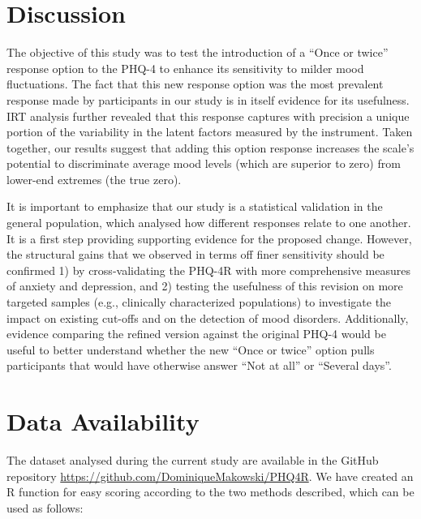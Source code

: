 \documentclass[
  man,floatsintext]{apa6}
\begin{document}
\hypertarget{discussion}{%
\section{Discussion}\label{discussion}}

The objective of this study was to test the introduction of a ``Once or twice'' response option to the PHQ-4 to enhance its sensitivity to milder mood fluctuations. The fact that this new response option was the most prevalent response made by participants in our study is in itself evidence for its usefulness. IRT analysis further revealed that this response captures with precision a unique portion of the variability in the latent factors measured by the instrument. Taken together, our results suggest that adding this option response increases the scale's potential to discriminate average mood levels (which are superior to zero) from lower-end extremes (the true zero).

It is important to emphasize that our study is a statistical validation in the general population, which analysed how different responses relate to one another. It is a first step providing supporting evidence for the proposed change. However, the structural gains that we observed in terms off finer sensitivity should be confirmed 1) by cross-validating the PHQ-4R with more comprehensive measures of anxiety and depression, and 2) testing the usefulness of this revision on more targeted samples (e.g., clinically characterized populations) to investigate the impact on existing cut-offs and on the detection of mood disorders. Additionally, evidence comparing the refined version against the original PHQ-4 would be useful to better understand whether the new ``Once or twice'' option pulls participants that would have otherwise answer ``Not at all'' or ``Several days''.

\newpage

\hypertarget{data-availability}{%
\section{Data Availability}\label{data-availability}}

The dataset analysed during the current study are available in the GitHub repository
\url{https://github.com/DominiqueMakowski/PHQ4R}.
We have created an R function for easy scoring according to the two methods described, which can be used as follows:
\end{document}
